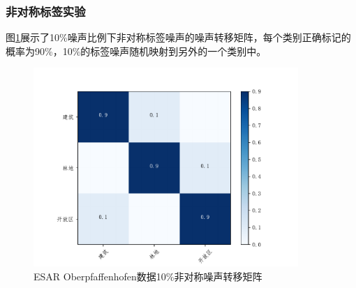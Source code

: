 \subsubsection{非对称标签实验}
图\ref{fig:ober_noise_random}展示了10\%噪声比例下非对称标签噪声的噪声转移矩阵，每个类别正确标记的概率为90\%，10\%的标签噪声随机映射到另外的一个类别中。
\begin{figure}[ht!]
    \centering
    \includegraphics[width=10.04cm]{pic/chapter4/ober/noise_random.pdf}
    \caption{ESAR Oberpfaffenhofen数据10\%非对称噪声转移矩阵}
    \label{fig:ober_noise_random}
\end{figure}

